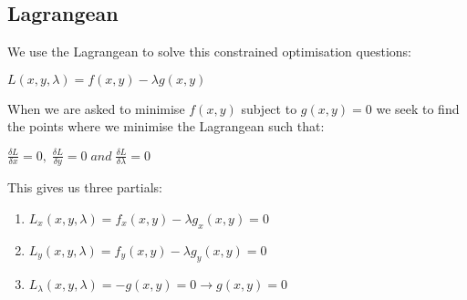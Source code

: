 \documentclass[12pt, letterpaper]{article}
\begin{document}
\subsection{Lagrangean}
We use the Lagrangean to solve this constrained optimisation questions:
\begin{center}
	$L(x,y, \lambda) = f(x,y) - \lambda g(x,y)$
\end{center}
When we are asked to minimise $f(x,y)$ subject to $g(x,y) = 0$ we seek to find the points where we minimise the Lagrangean such that:
\begin{center}
	\Large{$\frac{\delta L}{\delta x}=0, \; \frac{\delta L}{\delta y}=0\; and \; \frac{\delta L}{\delta \lambda}=0$}
\end{center}
This gives us three partials:
\begin{enumerate}
	\item $L_x(x,y,\lambda) = f_x(x,y) - \lambda g_x(x,y) = 0$
	\item $L_y(x,y, \lambda) = f_y(x, y) - \lambda g_y(x,y) = 0$
	\item $L_\lambda(x,y, \lambda) = -g(x,y) = 0 \rightarrow g(x,y) = 0$
\end{enumerate}
\begin{center}
\end{center}
\end{document}
